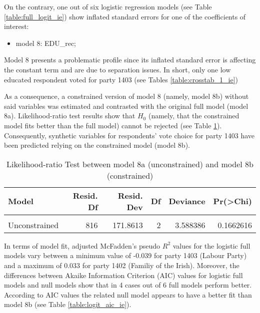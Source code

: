 \documentclass[
]{article}
\providecommand{\tightlist}{%
  \setlength{\itemsep}{0pt}\setlength{\parskip}{0pt}}
\begin{document}
On the contrary, one out of six logistic regression models (see Table \ref{table:full_logit_ie}) show
inflated standard errors for one of the coefficients of interest:

\begin{itemize}
\tightlist
\item
  model 8: EDU\_rec;
\end{itemize}

Model 8 presents a problematic profile since its inflated standard error is affecting the constant term and are due to separation issues. In short, only one low educated
respondent voted for party 1403 (see Tables \ref{table:crosstab_1_ie})

As a consequence, a constrained version of model 8 (namely, model 8b) without said variables was
estimated and contrasted with the original full model (model 8a). Likelihood-ratio test results show
that \(H_0\) (namely, that the constrained model fits better than the full model) cannot be rejected
(see Table \ref{table:lrtest_1_ie}). Consequently, synthetic variables for respondents' vote choice for
party 1403 have been predicted relying on the constrained model (model 8b).

\begin{table}[!h]

\caption{\label{tab:unnamed-chunk-91}Likelihood-ratio Test between model 8a (unconstrained) and model 8b (constrained)
                  \label{table:lrtest_1_ie}}
\centering
\begin{tabular}[t]{l|r|r|r|r|r}
\hline
Model & Resid. Df & Resid. Dev & Df & Deviance & Pr(>Chi)\\
\hline
\cellcolor{gray!6}{Constrained} & \cellcolor{gray!6}{818} & \cellcolor{gray!6}{175.4496} & \cellcolor{gray!6}{} & \cellcolor{gray!6}{} & \cellcolor{gray!6}{}\\
\hline
Unconstrained & 816 & 171.8613 & 2 & 3.588386 & 0.1662616\\
\hline
\end{tabular}
\end{table}

In terms of model fit, adjusted McFadden's pseudo \(R^2\) values for the logistic full models vary between
a minimum value of
-0.039
for party 1403
(Labour Party)
and a maximum of
0.033
for party 1402
(Familiy of the Irish).
Moreover, the differences between Akaike Information Criterion (AIC) values for logistic full models and
null models show that in 4 cases out of 6 full models perform better. According to AIC
values the related null model appears to have a better fit than model 8b (see Table
\ref{table:logit_aic_ie}).
\end{document}
